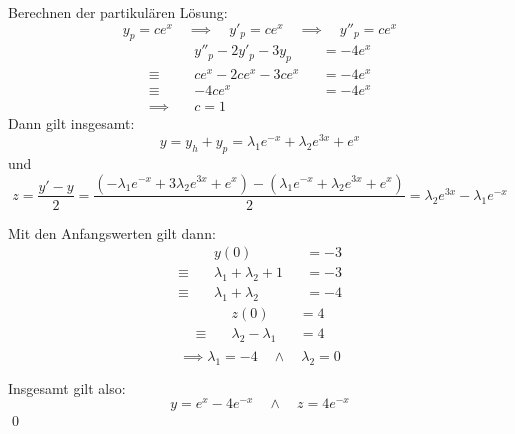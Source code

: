 \documentclass[answers]{exam}
\begin{document}
\begin{questions}
\begin{solution}
        Berechnen der partikulären Lösung:
        $$
            y_p = ce^x \quad \implies \quad y'_p = ce^x \quad \implies \quad y''_p = ce^x
        $$
        $$
            \begin{aligned}
                               & y''_p - 2y'_p  - 3y_p &  & = -4e^{x} \\
                \equiv \quad   & ce^x - 2ce^x  - 3ce^x &  & = -4e^{x} \\
                \equiv \quad   & -4ce^x                &  & = -4e^{x} \\
                \implies \quad & c = 1
            \end{aligned}
        $$
        Dann gilt insgesamt:
        $$
            y = y_h + y_p = \lambda_1e^{-x} + \lambda_2e^{3x} + e^x
        $$
        und
        $$
            z = \frac{y'- y}{2} = \frac{\left( -\lambda_1e^{-x} + 3\lambda_2e^{3x} + e^x \right) - \left( \lambda_1e^{-x} + \lambda_2e^{3x} + e^x \right)}{2} = \lambda_2e^{3x} - \lambda_1e^{-x}
        $$

        Mit den Anfangswerten gilt dann:
        $$
            \begin{aligned}
                             & y(0)                      &  & = -3 \\
                \equiv \quad & \lambda_1 + \lambda_2 + 1 &  & = -3 \\
                \equiv \quad & \lambda_1 + \lambda_2     &  & = -4
            \end{aligned}
        $$
        $$
            \begin{aligned}
                             & z(0)                  &  & = 4 \\
                \equiv \quad & \lambda_2 - \lambda_1 &  & = 4 \\
            \end{aligned}
        $$
        $$
            \implies \lambda_1 = -4 \quad \land \quad \lambda_2 = 0
        $$

        Insgesamt gilt also:
        $$
            y = e^x - 4e^{-x} \quad \land \quad z = 4e^{-x}
        $$\qed
    \end{solution}
\end{questions}
\end{document}
